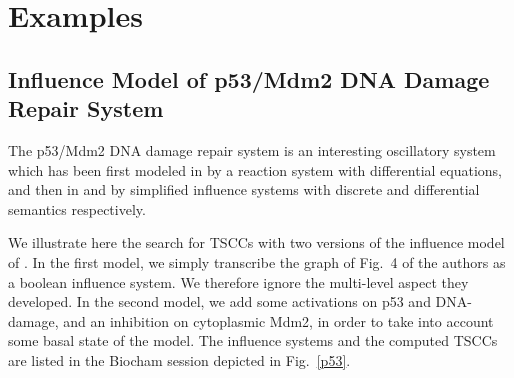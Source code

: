 \documentclass{llncs}
\begin{document}
\section{Examples}\label{ex}

\subsection{Influence Model of p53/Mdm2 DNA Damage Repair System~\cite{AOK09jtb}}

The p53/Mdm2 DNA damage repair system is an interesting oscillatory system which has been first modeled in \cite{CCT07plos}
by a reaction system with differential equations, and then in \cite{AOK09jtb} and \cite{OAK10jtb} by simplified influence systems with discrete and differential semantics respectively.

We illustrate here the search for TSCCs with two versions of the influence model of \cite{AOK09jtb}.
In the first model, we simply
   transcribe  the graph of Fig.~4 of the
   authors as a boolean influence system. We therefore ignore the multi-level aspect they developed.
In the second model, we add some activations on p53 and DNA-damage, and an inhibition on
   cytoplasmic Mdm2, in order to take into account some basal state of the
   model.
   The influence systems and the computed TSCCs are listed in the Biocham session depicted in Fig.~\ref{p53}.
      
\end{document}
